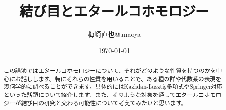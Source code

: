 \documentclass[uplatex]{jsarticle}
\title{結び目とエタールコホモロジー}
\author{梅崎直也@unaoya}
\date{\today}
\begin{document}
\maketitle

\begin{abstract}
この講演ではエタールコホモロジーについて、それがどのような性質を持つのかを中心にお話しします。特にそれらの性質を用いることで、ある種の群や代数系の表現を幾何学的に調べることができます。具体的にはKazhdan-Lusztig多項式やSpringer対応といった話題について紹介します。また、そのような対象を通してエタールコホモロジーが結び目の研究と交わる可能性について考えてみたいと思います。
\end{abstract}
\end{document}
